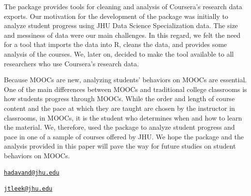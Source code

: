 The  package provides tools for cleaning and analysis of
Coursera's research data exports. Our motivation for the development of
the package was initially to analyze student progress using JHU Data
Science Specialization data. The size and messiness of data were our
main challenges. In this regard, we felt the need for a tool that
imports the data into R, cleans the data, and provides some analysis of
the courses. We, later on, decided to make the tool available to all
researchers who use Coursera's research data.

Because MOOCs are new, analyzing students' behaviors on MOOCs are
essential. One of the main differences between MOOCs and traditional
college classrooms is how students progress through MOOCs. While the
order and length of course content and the pace at which they are taught
are chosen by the instructor in classrooms, in MOOCs, it is the student
who determines when and how to learn the material. We, therefore, used
the  package to analyze student progress and pace in one of a
sample of courses offered by JHU. We hope the package and the analysis
provided in this paper will pave the way for future studies on student
behaviors on MOOCs.



\address{%
Aboozar Hadavand\\
Bloomberg School of Public Health, Johns Hopkins University\\
615 N. Wolfe Street\\ Baltimore, MD 21205, USA\\
}
\href{mailto:hadavand@jhu.edu}{\nolinkurl{hadavand@jhu.edu}}

\address{%
Jeffrey Leek\\
Bloomberg School of Public Health, Johns Hopkins University\\
615 N. Wolfe Street\\ Baltimore, MD 21205, USA\\
}
\href{mailto:jtleek@jhu.edu}{\nolinkurl{jtleek@jhu.edu}}

